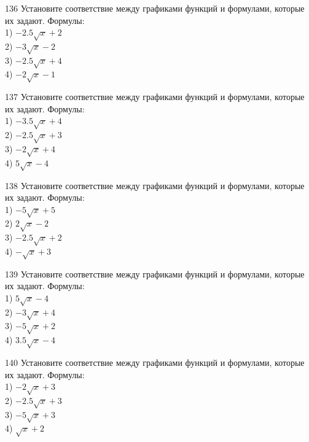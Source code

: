 \documentclass[4apaper]{article}
\begin{document}
\begin{taskBN}{136}
Установите соответствие между графиками функций и формулами, которые их задают. Формулы: \\1) $-2.5\sqrt{x}+2$\\2) $-3\sqrt{x}-2$\\3) $-2.5\sqrt{x}+4$\\4) $-2\sqrt{x}-1$
\end{taskBN}

\begin{taskBN}{137}
Установите соответствие между графиками функций и формулами, которые их задают. Формулы: \\1) $-3.5\sqrt{x}+4$\\2) $-2.5\sqrt{x}+3$\\3) $-2\sqrt{x}+4$\\4) $5\sqrt{x}-4$
\end{taskBN}

\begin{taskBN}{138}
Установите соответствие между графиками функций и формулами, которые их задают. Формулы: \\1) $-5\sqrt{x}+5$\\2) $2\sqrt{x}-2$\\3) $-2.5\sqrt{x}+2$\\4) $-\sqrt{x}+3$
\end{taskBN}

\begin{taskBN}{139}
Установите соответствие между графиками функций и формулами, которые их задают. Формулы: \\1) $5\sqrt{x}-4$\\2) $-3\sqrt{x}+4$\\3) $-5\sqrt{x}+2$\\4) $3.5\sqrt{x}-4$
\end{taskBN}

\begin{taskBN}{140}
Установите соответствие между графиками функций и формулами, которые их задают. Формулы: \\1) $-2\sqrt{x}+3$\\2) $-2.5\sqrt{x}+3$\\3) $-5\sqrt{x}+3$\\4) $\sqrt{x}+2$
\end{taskBN}
\end{document}
